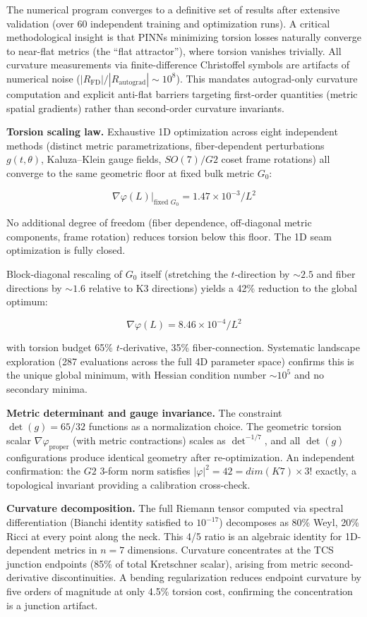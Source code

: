 \documentclass[11pt,a4paper]{article}
\newcommand{\Gtwo}{\mathrm{G}_2}
\newcommand{\Kseven}{K_7}
\newcommand{\dimE}{\mathrm{dim}}
\newcommand{\SO}{\mathrm{SO}}
\def\Gtwo{G2}%
\def\Kseven{K7}%
\def\dimE{dim}%
\def\SO{SO}%
\begin{document}
The numerical program converges to a definitive set of results after extensive validation (over 60 independent training and optimization runs). A critical methodological insight is that PINNs minimizing torsion losses naturally converge to near-flat metrics (the ``flat attractor''), where torsion vanishes trivially. All curvature measurements via finite-difference Christoffel symbols are artifacts of numerical noise ($|R_{\mathrm{FD}}|/|R_{\mathrm{autograd}}| \sim 10^8$). This mandates autograd-only curvature computation and explicit anti-flat barriers targeting first-order quantities (metric spatial gradients) rather than second-order curvature invariants.

\textbf{Torsion scaling law.} Exhaustive 1D optimization across eight independent methods (distinct metric parametrizations, fiber-dependent perturbations $g(t,\theta)$, Kaluza--Klein gauge fields, $\SO(7)/\Gtwo$ coset frame rotations) all converge to the same geometric floor at fixed bulk metric $G_0$:

$$\nabla\varphi(L)\big|_{\text{fixed }G_0} = 1.47 \times 10^{-3} / L^2$$

No additional degree of freedom (fiber dependence, off-diagonal metric components, frame rotation) reduces torsion below this floor. The 1D seam optimization is fully closed.

Block-diagonal rescaling of $G_0$ itself (stretching the $t$-direction by $\sim 2.5$ and fiber directions by $\sim 1.6$ relative to K3 directions) yields a 42\% reduction to the global optimum:

\[\boxed{\nabla\varphi(L) = 8.46 \times 10^{-4} / L^2}\]

with torsion budget 65\% $t$-derivative, 35\% fiber-connection. Systematic landscape exploration (287 evaluations across the full 4D parameter space) confirms this is the unique global minimum, with Hessian condition number $\sim 10^5$ and no secondary minima.

\textbf{Metric determinant and gauge invariance.} The constraint $\det(g) = 65/32$ functions as a normalization choice. The geometric torsion scalar $\nabla\varphi_{\mathrm{proper}}$ (with metric contractions) scales as $\det^{-1/7}$, and all $\det(g)$ configurations produce identical geometry after re-optimization. An independent confirmation: the $\Gtwo$ 3-form norm satisfies $|\varphi|^2 = 42 = \dimE(\Kseven) \times 3!$ exactly, a topological invariant providing a calibration cross-check.

\textbf{Curvature decomposition.} The full Riemann tensor computed via spectral differentiation (Bianchi identity satisfied to $10^{-17}$) decomposes as 80\% Weyl, 20\% Ricci at every point along the neck. This 4/5 ratio is an algebraic identity for 1D-dependent metrics in $n = 7$ dimensions. Curvature concentrates at the TCS junction endpoints (85\% of total Kretschner scalar), arising from metric second-derivative discontinuities. A bending regularization reduces endpoint curvature by five orders of magnitude at only 4.5\% torsion cost, confirming the concentration is a junction artifact.
\end{document}
